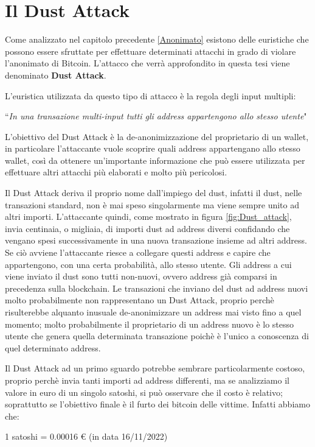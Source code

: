 \section{Il Dust Attack}
Come analizzato nel capitolo precedente \ref{Anonimato} esistono delle euristiche che possono essere sfruttate per effettuare determinati attacchi in grado di violare l'anonimato di Bitcoin. L'attacco che verrà approfondito in questa tesi viene denominato \textbf{Dust Attack}. 

L'euristica utilizzata da questo tipo di attacco è la regola degli input multipli:
\begin{center}
    ``\textit{In una transazione multi-input tutti gli address appartengono allo stesso utente}"
\end{center}
L'obiettivo del Dust Attack è la de-anonimizzazione del proprietario di un wallet, in particolare l'attaccante vuole scoprire quali address appartengano allo stesso wallet, così da ottenere un'importante informazione che può essere utilizzata per effettuare altri attacchi più elaborati e molto più pericolosi.

Il Dust Attack deriva il proprio nome dall'impiego del dust, infatti il dust, nelle transazioni standard, non è mai speso singolarmente ma viene sempre unito ad altri importi. L'attaccante quindi, come mostrato in figura \ref{fig:Dust_attack}, invia centinaia, o migliaia, di importi dust ad address diversi confidando che vengano spesi successivamente in una nuova transazione insieme ad altri address. Se ciò avviene l'attaccante riesce a collegare questi address e capire che appartengono, con una certa probabilità, allo stesso utente. Gli address a cui viene inviato il dust sono tutti non-nuovi, ovvero address già comparsi in precedenza sulla blockchain. Le transazioni che inviano del dust ad address nuovi  molto probabilmente non rappresentano un Dust Attack, proprio perchè risulterebbe alquanto inusuale de-anonimizzare un address mai visto fino a quel momento; molto probabilmente il proprietario di un address nuovo è lo stesso utente che genera quella determinata transazione poichè è l'unico a conoscenza di quel determinato address.

Il Dust Attack ad un primo sguardo potrebbe sembrare particolarmente costoso, proprio perchè invia tanti importi ad address differenti, ma se analizziamo il valore in euro di un singolo satoshi, si può osservare che il costo è relativo; soprattutto se l'obiettivo finale è il furto dei bitcoin delle vittime. Infatti abbiamo che:
\begin{center}
    1 satoshi = 0.00016 € (in data 16/11/2022) 
\end{center}

